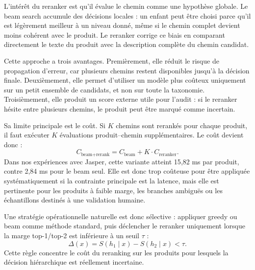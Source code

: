\documentclass[12pt,a4paper]{report}
\begin{document}
L'intérêt du reranker est qu'il évalue le chemin comme une hypothèse globale. Le beam search accumule des décisions locales : un enfant peut être choisi parce qu'il est légèrement meilleur à un niveau donné, même si le chemin complet devient moins cohérent avec le produit. Le reranker corrige ce biais en comparant directement le texte du produit avec la description complète du chemin candidat.

Cette approche a trois avantages. Premièrement, elle réduit le risque de propagation d'erreur, car plusieurs chemins restent disponibles jusqu'à la décision finale. Deuxièmement, elle permet d'utiliser un modèle plus coûteux uniquement sur un petit ensemble de candidats, et non sur toute la taxonomie. Troisièmement, elle produit un score externe utile pour l'audit : si le reranker hésite entre plusieurs chemins, le produit peut être marqué comme incertain.

Sa limite principale est le coût. Si $K$ chemins sont rerankés pour chaque produit, il faut exécuter $K$ évaluations produit--chemin supplémentaires. Le coût devient donc :
\begin{equation}
    C_{\text{beam+rerank}}
    =
    C_{\text{beam}}
    +
    K \cdot C_{\text{reranker}}.
\end{equation}
Dans nos expériences avec Jasper, cette variante atteint 15{,}82 ms par produit, contre 2{,}84 ms pour le beam seul. Elle est donc trop coûteuse pour être appliquée systématiquement si la contrainte principale est la latence, mais elle est pertinente pour les produits à faible marge, les branches ambiguës ou les échantillons destinés à une validation humaine.

Une stratégie opérationnelle naturelle est donc sélective : appliquer greedy ou beam comme méthode standard, puis déclencher le reranker uniquement lorsque la marge top-1/top-2 est inférieure à un seuil $\tau$ :
\begin{equation}
    \Delta(x)
    =
    S(h_1 \mid x) - S(h_2 \mid x)
    <
    \tau.
\end{equation}
Cette règle concentre le coût du reranking sur les produits pour lesquels la décision hiérarchique est réellement incertaine.
\end{document}
